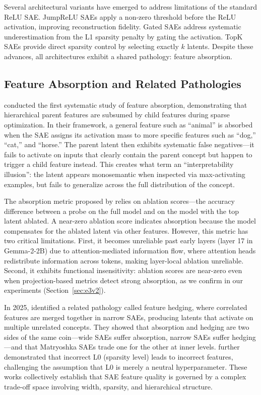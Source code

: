 \documentclass{article}
\begin{document}
Several architectural variants have emerged to address limitations of the standard ReLU SAE. JumpReLU SAEs \citep{rajamanoharan2024gated} apply a non-zero threshold before the ReLU activation, improving reconstruction fidelity. Gated SAEs \citep{rajamanoharan2024gated} address systematic underestimation from the L1 sparsity penalty by gating the activation. TopK SAEs \citep{gao2024scaling} provide direct sparsity control by selecting exactly $k$ latents. Despite these advances, all architectures exhibit a shared pathology: feature absorption.

\subsection{Feature Absorption and Related Pathologies}

\citet{chanin2024feature} conducted the first systematic study of feature absorption, demonstrating that hierarchical parent features are subsumed by child features during sparse optimization. In their framework, a general feature such as ``animal'' is absorbed when the SAE assigns its activation mass to more specific features such as ``dog,'' ``cat,'' and ``horse.'' The parent latent then exhibits systematic false negatives---it fails to activate on inputs that clearly contain the parent concept but happen to trigger a child feature instead. This creates what \citet{chanin2024feature} term an ``interpretability illusion'': the latent appears monosemantic when inspected via max-activating examples, but fails to generalize across the full distribution of the concept.

The absorption metric proposed by \citet{chanin2024feature} relies on ablation scores---the accuracy difference between a probe on the full model and on the model with the top latent ablated. A near-zero ablation score indicates absorption because the model compensates for the ablated latent via other features. However, this metric has two critical limitations. First, it becomes unreliable past early layers (layer 17 in Gemma-2-2B) due to attention-mediated information flow, where attention heads redistribute information across tokens, making layer-local ablation unreliable. Second, it exhibits functional insensitivity: ablation scores are near-zero even when projection-based metrics detect strong absorption, as we confirm in our experiments (Section~\ref{sec:e3v2}).

In 2025, \citet{chanin2025ahedging} identified a related pathology called feature hedging, where correlated features are merged together in narrow SAEs, producing latents that activate on multiple unrelated concepts. They showed that absorption and hedging are two sides of the same coin---wide SAEs suffer absorption, narrow SAEs suffer hedging---and that Matryoshka SAEs \citep{bussmann2025matryoshka} trade one for the other at inner levels. \citet{chanin2025bl0} further demonstrated that incorrect L0 (sparsity level) leads to incorrect features, challenging the assumption that L0 is merely a neutral hyperparameter. These works collectively establish that SAE feature quality is governed by a complex trade-off space involving width, sparsity, and hierarchical structure.
\end{document}
